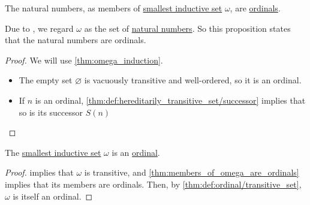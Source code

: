 \begin{proposition}\label{thm:members_of_omega_are_ordinals}
  The natural numbers, as members of \hyperref[def:smallest_inductive_set]{smallest inductive set} \( \omega \), are \hyperref[def:ordinal]{ordinals}.
\end{proposition}
\begin{comments}
  \item Due to , we regard \( \omega \) as the set of \hyperref[def:natural_numbers]{natural numbers}. So this proposition states that the natural numbers are ordinals.
\end{comments}
\begin{proof}
  We will use \cref{thm:omega_induction}.
  \begin{itemize}
    \item The empty set \( \varnothing \) is vacuously transitive and well-ordered, so it is an ordinal.
    \item If \( n \) is an ordinal, \cref{thm:def:hereditarily_transitive_set/successor} implies that so is its successor \( S(n) \)
  \end{itemize}
\end{proof}

\begin{corollary}\label{thm:omega_is_an_ordinal}
  The \hyperref[def:smallest_inductive_set]{smallest inductive set} \( \omega \) is an \hyperref[def:ordinal]{ordinal}.
\end{corollary}
\begin{proof}
   implies that \( \omega \) is transitive, and \cref{thm:members_of_omega_are_ordinals} implies that its members are ordinals. Then, by \cref{thm:def:ordinal/transitive_set}, \( \omega \) is itself an ordinal.
\end{proof}


